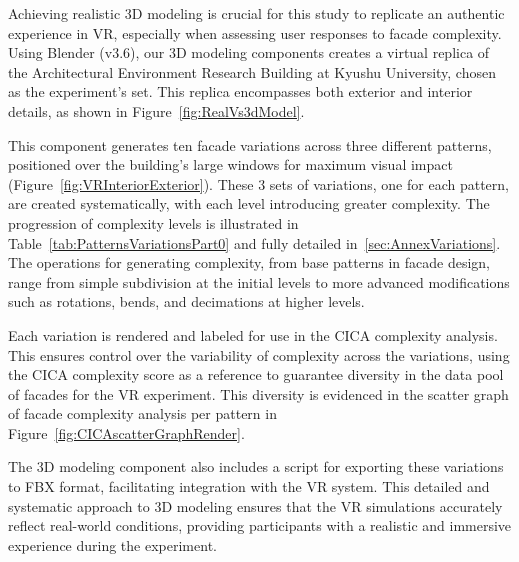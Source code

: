 %    



Achieving realistic 3D modeling is crucial for this study to replicate an authentic experience in VR, especially when assessing user responses to facade complexity.
Using Blender (v3.6), our 3D modeling components creates a virtual replica of the Architectural Environment Research Building at Kyushu University, chosen as the experiment's set.
This replica encompasses both exterior and interior details, as shown in Figure~\ref{fig:RealVs3dModel}.

This component generates ten facade variations across three different patterns, positioned over the building's large windows for maximum visual impact (Figure~\ref{fig:VRInteriorExterior}). These 3 sets of variations, one for each pattern, are created systematically, with each level introducing greater complexity.
The progression of complexity levels is illustrated in Table~\ref{tab:PatternsVariationsPart0} and fully detailed in~\ref{sec:AnnexVariations}.
The operations for generating complexity, from base patterns in facade design, range from simple subdivision at the initial levels to more advanced modifications such as rotations, bends, and decimations at higher levels.

Each variation is rendered and labeled for use in the CICA complexity analysis.
This ensures control over the variability of complexity across the variations, using the CICA complexity score as a reference to guarantee diversity in the data pool of facades for the VR experiment.
This diversity is evidenced in the scatter graph of facade complexity analysis per pattern in Figure~\ref{fig:CICAscatterGraphRender}.

The 3D modeling component also includes a script for exporting these variations to FBX format, facilitating integration with the VR system.
This detailed and systematic approach to 3D modeling ensures that the VR simulations accurately reflect real-world conditions, providing participants with a realistic and immersive experience during the experiment.


